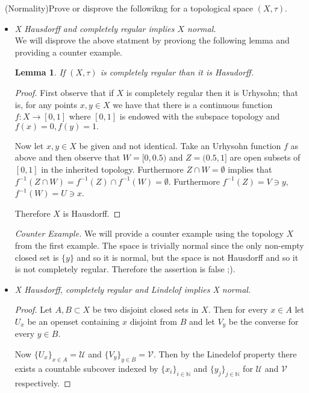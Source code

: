 \documentclass[11pt]{amsart}
\newtheorem{lemma}[theorem]{Lemma}
\theoremstyle{definition}
\numberwithin{theorem}{section}
\numberwithin{definition}{section}
\numberwithin{equation}{section}
\def\scriptv{{\mathcal V}}
\def\scriptu{{\mathcal U}}
\begin{document}
\medskip {}\ (Normality)\:Prove or disprove the followikng for a topological space $(X, \tau).$
\begin{itemize}
	\item \emph{X Hausdorff and completely regular implies $X$ normal.} \\

	\noindent We will disprove the above statment by proviong the following lemma and providing a counter example. 

	\begin{lemma}
		If $(X, \tau)$ is completely regular than it is Hasudorff. 
	\end{lemma}
	\begin{proof}
		First observe that if $X$ is completely regular then it is Urhysohn; that is, for any points $x, y \in X$ we have that there is a continuous function $f: X \to [0,1]$ where $[0,1]$ is endowed with the subspace topology and $f(x) = 0, f(y) = 1.$

		Now let $x,y \in X$ be given and not identical. Take an Urhysohn function $f$ as above and then observe that $W = [0, 0.5)$ and $Z = (0.5, 1]$ are open subsets of $[0,1]$ in the inherited topology. Furthermore  $Z \cap W = \emptyset$ implies that $f^{-1}(Z \cap W) = f^{-1}(Z) \cap f^{-1}(W) = \emptyset.$ Furthermore $ f^{-1}(Z) = V \ni y$, $ f^{-1}(W) = U \ni x$. 

		Therefore $X$ is Hausdorff.
	\end{proof}

	\emph{Counter Example.} We will provide a counter example using the topology $X$ from the first example. The space is trivially normal since the only  non-empty closed set is $\{y\}$ and so it is normal, but the space is not Hausdorff and so it is not completely regular. Therefore the assertion is false ;).

	\item \emph{X Hausdorff, completely regular and Lindelof implies X normal.} \\


	\begin{proof}
		Let $A,B \subset X$ be two disjoint closed sets in $X.$ Then for every $x \in A$ let $U_x$ be an openset containing $x$ disjoint from $B$ and let $V_y$ be the converse for every $y \in B$.	

		Now $\{U_x\}_{x \in A} = \scriptu$ and $\{V_y\}_{y \in B} = \scriptv$. Then by the Linedelof property there exists a countable subcover indexed by $\{x_i\}_{i \in \mathbb{N}}$ and $\{y_j\}_{j \in \mathbb{N}}$  for $\scriptu$ and $\scriptv$ respectively.


\end{proof}
\end{itemize}
\end{document}
